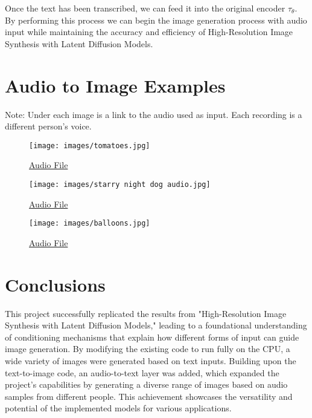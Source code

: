 \documentclass{article}
\begin{document}
Once the text has been transcribed, we can feed it into the original encoder $\tau_{\theta}$. By performing this process we can begin the image generation process with audio input while maintaining the accuracy and efficiency of High-Resolution Image Synthesis with Latent Diffusion Models.

\section{Audio to Image Examples}

Note: Under each image is a link to the audio used as input. Each recording is a different person's voice.
\begin{figure}[h!]
\begin{center}
  \texttt{[image: images/tomatoes.jpg]}
\end{center}
  \caption{\href{https://tinyurl.com/tomatoesswimming}{Audio File}}
  \label{fig:tomatoes}
\end{figure}

\begin{figure}[h!]
\begin{center}
  \texttt{[image: images/starry night dog audio.jpg]}
\end{center}
  \caption{\href{https://tinyurl.com/dogstarrynight}{Audio File}}
  \label{fig:starry night}
\end{figure}

\begin{figure}[h!]
\begin{center}
  \texttt{[image: images/balloons.jpg]}
\end{center}
  \caption{\href{https://tinyurl.com/balloonsinocean}{Audio File}}
  \label{fig:balloons}
\end{figure}

\newpage
\section{Conclusions}
This project successfully replicated the results from "High-Resolution Image Synthesis with Latent Diffusion Models," leading to a foundational understanding of conditioning mechanisms that explain how different forms of input can guide image generation. By modifying the existing code to run fully on the CPU, a wide variety of images were generated based on text inputs. Building upon the text-to-image code, an audio-to-text layer was added, which expanded the project's capabilities by generating a diverse range of images based on audio samples from different people. This achievement showcases the versatility and potential of the implemented models for various applications.
\end{document}
